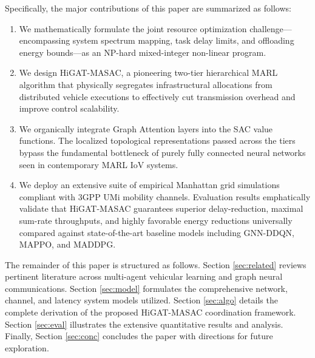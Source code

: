 Specifically, the major contributions of this paper are summarized as follows:
\begin{enumerate}
    \item We mathematically formulate the joint resource optimization challenge---encompassing system spectrum mapping, task delay limits, and offloading energy bounds---as an NP-hard mixed-integer non-linear program.
    \item We design HiGAT-MASAC, a pioneering two-tier hierarchical MARL algorithm that physically segregates infrastructural allocations from distributed vehicle executions to effectively cut transmission overhead and improve control scalability.
    \item We organically integrate Graph Attention layers into the SAC value functions. The localized topological representations passed across the tiers bypass the fundamental bottleneck of purely fully connected neural networks seen in contemporary MARL IoV systems.
    \item We deploy an extensive suite of empirical Manhattan grid simulations compliant with 3GPP UMi mobility channels. Evaluation results emphatically validate that HiGAT-MASAC guarantees superior delay-reduction, maximal sum-rate throughputs, and highly favorable energy reductions universally compared against state-of-the-art baseline models including GNN-DDQN, MAPPO, and MADDPG.
\end{enumerate}

The remainder of this paper is structured as follows. Section \ref{sec:related} reviews pertinent literature across multi-agent vehicular learning and graph neural communications. Section \ref{sec:model} formulates the comprehensive network, channel, and latency system models utilized. Section \ref{sec:algo} details the complete derivation of the proposed HiGAT-MASAC coordination framework. Section \ref{sec:eval} illustrates the extensive quantitative results and analysis. Finally, Section \ref{sec:conc} concludes the paper with directions for future exploration.
